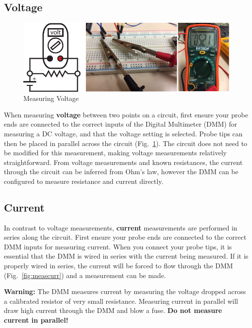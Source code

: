 \documentclass{tufte-book}
\begin{document}
\subsection*{Voltage}






\begin{figure}[h]
\caption{Measuring Voltage}
\label{fig:measvolt}
\begin{center}
\includegraphics{DMM_voltage_meas.pdf}
\end{center}
\end{figure}

When measuring \textbf{voltage} between two points on a circuit, first ensure your probe ends are connected to the correct inputs of the Digital Multimeter (DMM) for measuring a DC voltage, and that the voltage setting is selected.
Probe tips can then be placed in parallel across the circuit (Fig.~\ref{fig:measvolt}). 
The circuit does not need to be modified for this measurement, making voltage measurements relatively straightforward.
From voltage measurements and known resistances, the current through the circuit can be inferred from Ohm's law, however the DMM can be configured to measure resistance and current directly.

\subsection*{Current}

In contrast to voltage measurements, \textbf{current} measurements are performed in series along the circuit.
First ensure your probe ends are connected to the correct DMM inputs for measuring current.  
When you connect your probe tips, it is essential that the DMM is wired in series with the current being measured.  
If it is properly wired in series, the current will be forced to flow through the DMM (Fig.~\ref{fig:meascurr}) and a measurement can be made.

\textbf{Warning:} The DMM measures current by measuring the voltage dropped across a calibrated resistor of very small resistance. Measuring current in parallel will draw high current through the DMM and blow a fuse. \textbf{Do not measure current in parallel!}
\end{document}
